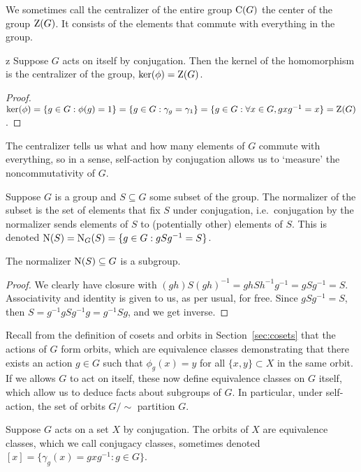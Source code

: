 \begin{definition}
    We sometimes call the centralizer of the entire group \(\operatorname{C}(G)\)
    the center of the group \(\operatorname{Z}(G)\).
    It consists of the elements that commute with everything in the group.
\end{definition}
\begin{proposition}z
    Suppose \(G\) acts on itself by conjugation.
    Then the kernel of the homomorphism is the centralizer of the group,
    \(\ker(\phi) = \operatorname{Z}(G)\).
\end{proposition}
\begin{proof}
    \(\ker(\phi) = \{g \in G : \phi(g) = 1\}
    = \{g \in G : \gamma_g = \gamma_1\}
    = \{g \in G : \forall x \in G, gxg^{-1} = x\}
    = \operatorname{Z}(G)\).
\end{proof}
\begin{remark}
    The centralizer tells us what and how many elements of \(G\)
    commute with everything,
    so in a sense, self-action by conjugation
    allows us to `measure' the noncommutativity of \(G\).
\end{remark}

\begin{definition}
    Suppose \(G\) is a group
    and \(S \subseteq G\) some subset of the group.
    The normalizer of the subset
    is the set of elements that fix \(S\) under conjugation,
    i.e.\ conjugation by the normalizer sends elements of \(S\)
    to (potentially other) elements of \(S\).
    This is denoted \(\operatorname{N}(S) = \operatorname{N}_G(S)
    = \{g \in G : gSg^{-1} = S\}\).
\end{definition}
\begin{proposition}\label{prop:normalizer-subgroup}
    The normalizer \(\operatorname{N}(S) \subseteq G\) is a subgroup.
\end{proposition}
\begin{proof}
    We clearly have closure with
    \((gh)S{(gh)}^{-1} = ghSh^{-1}g^{-1} = gSg^{-1} = S\).
    Associativity and identity is given to us,
    as per usual, for free.
    Since \(gSg^{-1} = S\),
    then \(S = g^{-1}gSg^{-1}g = g^{-1}Sg\),
    and we get inverse.
\end{proof}

\begin{remark}
    Recall from the definition of cosets and orbits
    in Section~\ref{sec:cosets}
    that the actions of \(G\) form orbits,
    which are equivalence classes demonstrating that
    there exists an action \(g \in G\)
    such that \(\phi_g(x) = y\)
    for all \(\{x,y\} \subset X\) in the same orbit.
    If we allows \(G\) to act on itself,
    these now define equivalence classes on \(G\) itself,
    which allow us to deduce facts about subgroups of \(G\).
    In particular, under self-action,
    the set of orbits \(G/{\sim}\) partition \(G\).
\end{remark}
\begin{definition}
    Suppose \(G\) acts on a set \(X\) by conjugation.
    The orbits of \(X\) are equivalence classes,
    which we call conjugacy classes,
    sometimes denoted \([x] = \{\gamma_g(x) = gxg^{-1} : g \in G\}\).
\end{definition}

